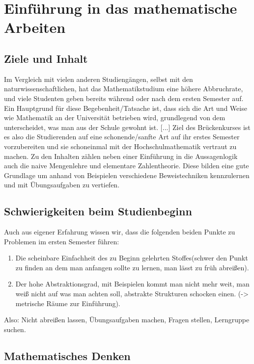 \chapter{Einführung in das mathematische Arbeiten}
\section{Ziele und Inhalt}
Im Vergleich mit vielen anderen Studiengängen, selbst mit den naturwissenschaftlichen,
hat das Mathematikstudium eine höhere Abbruchrate, und viele Studenten geben bereits während
oder nach dem ersten Semester auf. Ein Hauptgrund für diese Begebenheit/Tatsache ist, dass
sich die Art und Weise wie Mathematik an der Universität betrieben wird, grundlegend von dem
unterscheidet, was man aus der Schule gewohnt ist. [...] Ziel des Brückenkurses ist es also die
Studierenden auf eine schonende/sanfte Art auf ihr erstes Semester vorzubereiten und sie schoneinmal
mit der Hochschulmathematik vertraut zu machen. Zu den Inhalten zählen neben einer Einführung
in die Aussagenlogik auch die naive Mengenlehre und elementare Zahlentheorie. Diese bilden
eine gute Grundlage um anhand von Beispielen verschiedene Beweistechniken kennzulernen und
mit Übungsaufgaben zu vertiefen.

\section{Schwierigkeiten beim Studienbeginn}
Auch aus eigener Erfahrung wissen wir, dass die folgenden beiden Punkte zu Problemen im ersten
Semester führen:
\begin{enumerate}
    \item
    Die scheinbare Einfachheit des zu Beginn gelehrten Stoffes(schwer den Punkt zu finden an
    dem man anfangen sollte zu lernen, man lässt zu früh abreißen).
    \item
    Der hohe Abstraktionsgrad, mit Beispielen kommt man nicht mehr weit, man weiß nicht auf
    was man achten soll, abstrakte Strukturen schocken einen. (-> metrische Räume zur Einführung).
\end{enumerate}
Also: Nicht abreißen lassen, Übungsaufgaben machen, Fragen stellen, Lerngruppe suchen.

\section{Mathematisches Denken}

